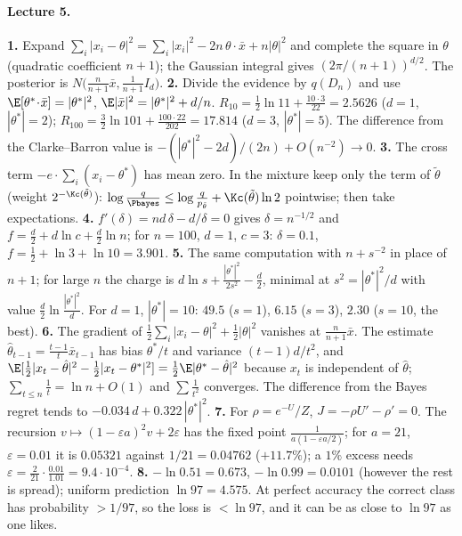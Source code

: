 \paragraph{Lecture 5.}
\textbf{1.} Expand $\sum_i|x_i-\theta|^2=\sum_i|x_i|^2-2n\,\theta\!\cdot\!\bar x+n|\theta|^2$ and complete the square in $\theta$ (quadratic coefficient $n+1$); the Gaussian integral gives $(2\pi/(n+1))^{d/2}$. The posterior is $N\big(\frac n{n+1}\bar x,\frac1{n+1}I_d\big)$. \quad
\textbf{2.} Divide the evidence by $q(D_n)$ and use $\E[\theta^*\!\cdot\!\bar x]=|\theta^*|^2$, $\E|\bar x|^2=|\theta^*|^2+d/n$. $R_{10}=\frac12\ln11+\frac{10\cdot3}{22}=2.5626$ ($d=1$, $|\theta^*|=2$); $R_{100}=\frac32\ln101+\frac{100\cdot22}{202}=17.814$ ($d=3$, $|\theta^*|=5$). The difference from the Clarke--Barron value is $-(|\theta^*|^2-2d)/(2n)+O(n^{-2})\to0$. \quad
\textbf{3.} The cross term $-e\cdot\sum_i(x_i-\theta^*)$ has mean zero. In the mixture keep only the term of $\tilde\theta$ (weight $2^{-\Kc(\tilde\theta)}$): $\log\frac q{\Pbayes}\le\log\frac q{p_{\tilde\theta}}+\Kc(\tilde\theta)\ln2$ pointwise; then take expectations. \quad
\textbf{4.} $f'(\delta)=nd\,\delta-d/\delta=0$ gives $\delta=n^{-1/2}$ and $f=\frac d2+d\ln c+\frac d2\ln n$; for $n=100$, $d=1$, $c=3$: $\delta=0.1$, $f=\frac12+\ln3+\ln10=3.901$. \quad
\textbf{5.} The same computation with $n+s^{-2}$ in place of $n+1$; for large $n$ the charge is $d\ln s+\frac{|\theta^*|^2}{2s^2}-\frac d2$, minimal at $s^2=|\theta^*|^2/d$ with value $\frac d2\ln\frac{|\theta^*|^2}d$. For $d=1$, $|\theta^*|=10$: $49.5$ ($s=1$), $6.15$ ($s=3$), $2.30$ ($s=10$, the best). \quad
\textbf{6.} The gradient of $\frac12\sum_i|x_i-\theta|^2+\frac12|\theta|^2$ vanishes at $\frac n{n+1}\bar x$. The estimate $\hat\theta_{t-1}=\frac{t-1}t\bar x_{t-1}$ has bias $\theta^*/t$ and variance $(t-1)d/t^2$, and $\E[\frac12|x_t-\hat\theta|^2-\frac12|x_t-\theta^*|^2]=\frac12\E|\theta^*-\hat\theta|^2$ because $x_t$ is independent of $\hat\theta$; $\sum_{t\le n}\frac1t=\ln n+O(1)$ and $\sum\frac1{t^2}$ converges. The difference from the Bayes regret tends to $-0.034\,d+0.322\,|\theta^*|^2$. \quad
\textbf{7.} For $\rho=e^{-U}/Z$, $J=-\rho U'-\rho'=0$. The recursion $v\mapsto(1-\varepsilon a)^2v+2\varepsilon$ has the fixed point $\frac1{a(1-\varepsilon a/2)}$; for $a=21$, $\varepsilon=0.01$ it is $0.05321$ against $1/21=0.04762$ ($+11.7\%$); a $1\%$ excess needs $\varepsilon=\frac2{21}\cdot\frac{0.01}{1.01}=9.4\cdot10^{-4}$. \quad
\textbf{8.} $-\ln0.51=0.673$, $-\ln0.99=0.0101$ (however the rest is spread); uniform prediction $\ln97=4.575$. At perfect accuracy the correct class has probability $>1/97$, so the loss is $<\ln97$, and it can be as close to $\ln97$ as one likes. \quad
